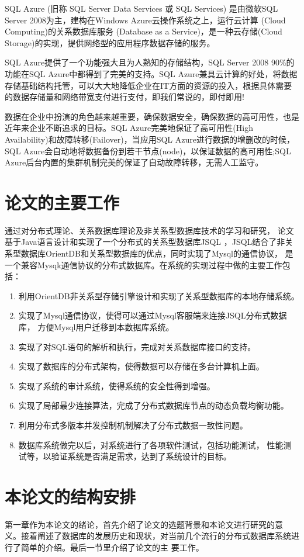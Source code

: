 	
	SQL Azure (旧称 SQL Server Data Services 或 SQL Services) 是由微软SQL Server 2008为主，建构在Windows Azure云操作系统之上，运行云计算 (Cloud Computing)的关系数据库服务 (Database as a Service)，是一种云存储(Cloud Storage)的实现，提供网络型的应用程序数据存储的服务。
	
	SQL Azure提供了一个功能强大且为人熟知的存储结构，SQL Server 2008 90\%的功能在SQL Azure中都得到了完美的支持。SQL Azure兼具云计算的好处，将数据存储基础结构托管，可以大大地降低企业在IT方面的资源的投入，根据具体需要的数据存储量和网络带宽支付进行支付，即我们常说的，即付即用!
	
	数据在企业中扮演的角色越来越重要，确保数据安全，确保数据的高可用性，也是近年来企业不断追求的目标。SQL Azure完美地保证了高可用性(High Availability)和故障转移(Failover)，当应用SQL Azure进行数据的增删改的时候， SQL Azure会自动地将数据备份到若干节点(node)，以保证数据的高可用性;SQL Azure后台内置的集群机制完美的保证了自动故障转移，无需人工监守。
\section{论文的主要工作}
通过对分布式理论、关系数据库理论及非关系型数据库技术的学习和研究，
论文基于Java语言设计和实现了一个分布式的关系型数据库JSQL
，JSQL结合了非关系型数据库OrientDB和关系型数据库的优点，同时实现了Mysql的通信协议，
是一个兼容Mysqk通信协议的分布式数据库。在系统的实现过程中做的主要工作包括：
\begin{enumerate}[fullwidth,itemindent=2em]
	\item 利用OrientDB非关系型存储引擎设计和实现了关系型数据库的本地存储系统。
	\item 实现了Mysql通信协议，使得可以通过Mysql客服端来连接JSQL分布式数据库，
	方便Mysql用户迁移到本数据库系统。
	\item 实现了对SQL语句的解析和执行，完成对关系数据库接口的支持。
	\item 实现了数据库的分布式架构，使得数据可以存储在多台计算机上面。
	\item 实现了系统的审计系统，使得系统的安全性得到增强。
	\item 实现了局部最少连接算法，完成了分布式数据库节点的动态负载均衡功能。
	\item 利用分布式多版本并发控制机制解决了分布式数据一致性问题。
	\item 数据库系统做完以后，对系统进行了各项软件测试，包括功能测试，
	性能测试等，以验证系统是否满足需求，达到了系统设计的目标。
\end{enumerate}
\section{本论文的结构安排}
第一章作为本论文的绪论，首先介绍了论文的选题背景和本论文进行研究的意
义。接着阐述了数据库的发展历史和现状，对当前几个流行的分布式数据库系统进行了简单的介绍。最后一节里介绍了论文的主
要工作。

